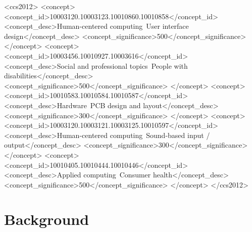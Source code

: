 \documentclass[manuscript,screen]{acmart}
\begin{document}
\begin{CCSXML}
  <ccs2012>
     <concept>
         <concept_id>10003120.10003123.10010860.10010858</concept_id>
         <concept_desc>Human-centered computing~User interface design</concept_desc>
         <concept_significance>500</concept_significance>
         </concept>
     <concept>
         <concept_id>10003456.10010927.10003616</concept_id>
         <concept_desc>Social and professional topics~People with disabilities</concept_desc>
         <concept_significance>500</concept_significance>
         </concept>
     <concept>
         <concept_id>10010583.10010584.10010587</concept_id>
         <concept_desc>Hardware~PCB design and layout</concept_desc>
         <concept_significance>300</concept_significance>
         </concept>
     <concept>
         <concept_id>10003120.10003121.10003125.10010597</concept_id>
         <concept_desc>Human-centered computing~Sound-based input / output</concept_desc>
         <concept_significance>300</concept_significance>
         </concept>
     <concept>
         <concept_id>10010405.10010444.10010446</concept_id>
         <concept_desc>Applied computing~Consumer health</concept_desc>
         <concept_significance>500</concept_significance>
         </concept>
   </ccs2012>
\end{CCSXML}



\maketitle


\section{Background}
\end{document}
